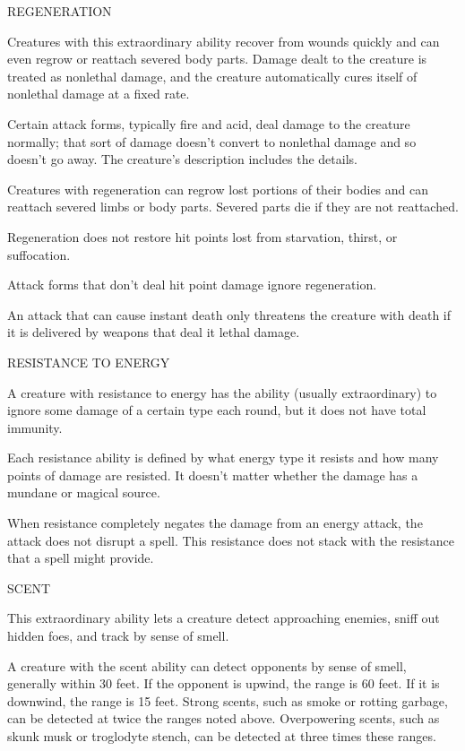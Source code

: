 \documentclass{article}
\begin{document}
\vspace{12pt}
REGENERATION

Creatures with this extraordinary ability recover from wounds quickly and can even 
regrow or reattach severed body parts. Damage dealt to the creature is treated 
as nonlethal damage, and the creature automatically cures itself of nonlethal damage 
at a fixed rate.

Certain attack forms, typically fire and acid, deal damage to the creature normally; 
that sort of damage doesn't convert to nonlethal damage and so doesn't go away. 
The creature's description includes the details.

Creatures with regeneration can regrow lost portions of their bodies and can reattach 
severed limbs or body parts. Severed parts die if they are not reattached.

Regeneration does not restore hit points lost from starvation, thirst, or suffocation.

Attack forms that don't deal hit point damage ignore regeneration.

An attack that can cause instant death only threatens the creature with death if 
it is delivered by weapons that deal it lethal damage.

\vspace{12pt}
RESISTANCE TO ENERGY

A creature with resistance to energy has the ability (usually extraordinary) to 
ignore some damage of a certain type each round, but it does not have total immunity. 

Each resistance ability is defined by what energy type it resists and how many 
points of damage are resisted. It doesn't matter whether the damage has a mundane 
or magical source.

When resistance completely negates the damage from an energy attack, the attack 
does not disrupt a spell. This resistance does not stack with the resistance that 
a spell\textit{ }might provide.

\vspace{12pt}
SCENT

This extraordinary ability lets a creature detect approaching enemies, sniff out 
hidden foes, and track by sense of smell.

A creature with the scent ability can detect opponents by sense of smell, generally 
within 30 feet. If the opponent is upwind, the range is 60 feet. If it is downwind, 
the range is 15 feet. Strong scents, such as smoke or rotting garbage, can be detected 
at twice the ranges noted above. Overpowering scents, such as skunk musk or troglodyte 
stench, can be detected at three times these ranges.
\end{document}
